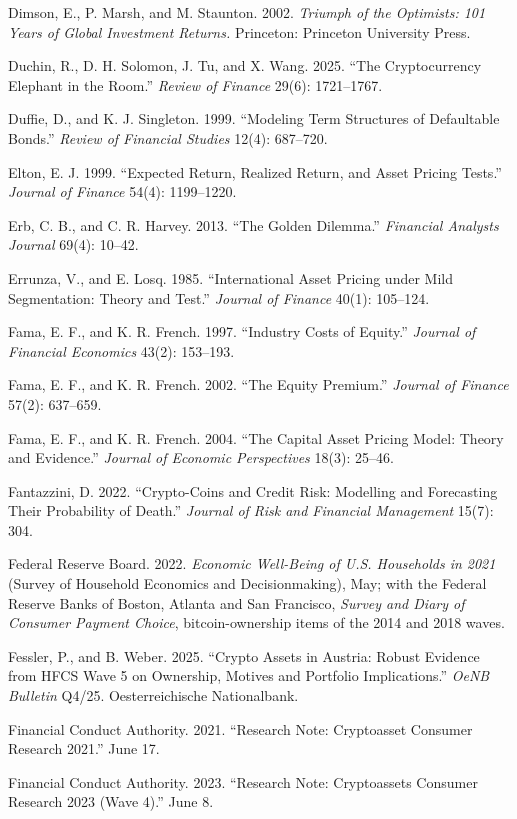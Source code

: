 \documentclass[11pt]{article}
\begin{document}
\begin{list}{}{\setlength{\itemindent}{-1.5em}\setlength{\leftmargin}{1.5em}\setlength{\itemsep}{2pt}\setlength{\parsep}{0pt}}
\item Dimson, E., P. Marsh, and M. Staunton. 2002. \emph{Triumph of the Optimists: 101 Years of Global Investment Returns.} Princeton: Princeton University Press.
\item Duchin, R., D. H. Solomon, J. Tu, and X. Wang. 2025. ``The Cryptocurrency Elephant in the Room.'' \emph{Review of Finance} 29(6): 1721--1767.
\item Duffie, D., and K. J. Singleton. 1999. ``Modeling Term Structures of Defaultable Bonds.'' \emph{Review of Financial Studies} 12(4): 687--720.
\item Elton, E. J. 1999. ``Expected Return, Realized Return, and Asset Pricing Tests.'' \emph{Journal of Finance} 54(4): 1199--1220.
\item Erb, C. B., and C. R. Harvey. 2013. ``The Golden Dilemma.'' \emph{Financial Analysts Journal} 69(4): 10--42.
\item Errunza, V., and E. Losq. 1985. ``International Asset Pricing under Mild Segmentation: Theory and Test.'' \emph{Journal of Finance} 40(1): 105--124.
\item Fama, E. F., and K. R. French. 1997. ``Industry Costs of Equity.'' \emph{Journal of Financial Economics} 43(2): 153--193.
\item Fama, E. F., and K. R. French. 2002. ``The Equity Premium.'' \emph{Journal of Finance} 57(2): 637--659.
\item Fama, E. F., and K. R. French. 2004. ``The Capital Asset Pricing Model: Theory and Evidence.'' \emph{Journal of Economic Perspectives} 18(3): 25--46.
\item Fantazzini, D. 2022. ``Crypto-Coins and Credit Risk: Modelling and Forecasting Their Probability of Death.'' \emph{Journal of Risk and Financial Management} 15(7): 304.
\item Federal Reserve Board. 2022. \emph{Economic Well-Being of U.S. Households in 2021} (Survey of Household Economics and Decisionmaking), May; with the Federal Reserve Banks of Boston, Atlanta and San Francisco, \emph{Survey and Diary of Consumer Payment Choice}, bitcoin-ownership items of the 2014 and 2018 waves.
\item Fessler, P., and B. Weber. 2025. ``Crypto Assets in Austria: Robust Evidence from HFCS Wave 5 on Ownership, Motives and Portfolio Implications.'' \emph{OeNB Bulletin} Q4/25. Oesterreichische Nationalbank.
\item Financial Conduct Authority. 2021. ``Research Note: Cryptoasset Consumer Research 2021.'' June 17.
\item Financial Conduct Authority. 2023. ``Research Note: Cryptoassets Consumer Research 2023 (Wave 4).'' June 8.

\end{list}
\end{document}
